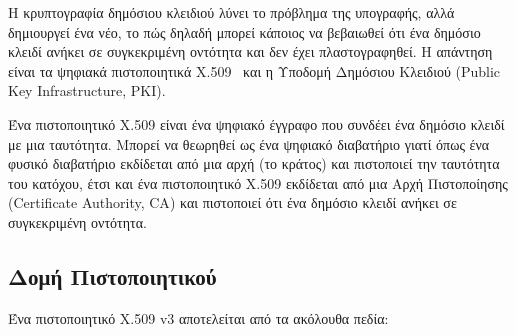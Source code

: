 Η κρυπτογραφία δημόσιου κλειδιού λύνει το πρόβλημα της υπογραφής, αλλά
δημιουργεί ένα νέο, το πώς δηλαδή μπορεί κάποιος να βεβαιωθεί ότι ένα δημόσιο κλειδί
ανήκει σε συγκεκριμένη οντότητα και δεν έχει πλαστογραφηθεί. Η απάντηση
είναι τα ψηφιακά πιστοποιητικά \textlatin{X.509}~\cite{x509rfc} και η
Υποδομή Δημόσιου Κλειδιού (\textlatin{Public Key Infrastructure, PKI}).

Ένα πιστοποιητικό \textlatin{X.509} είναι ένα ψηφιακό έγγραφο που συνδέει
ένα δημόσιο κλειδί με μια ταυτότητα. Μπορεί να θεωρηθεί ως ένα ψηφιακό
διαβατήριο γιατί όπως ένα φυσικό διαβατήριο εκδίδεται από μια αρχή (το κράτος)
και πιστοποιεί την ταυτότητα του κατόχου, έτσι και ένα πιστοποιητικό
\textlatin{X.509} εκδίδεται από μια Αρχή Πιστοποίησης (\textlatin{Certificate
Authority, CA}) και πιστοποιεί ότι ένα δημόσιο κλειδί ανήκει σε συγκεκριμένη
οντότητα.

\subsection{Δομή Πιστοποιητικού}
\label{subsec:x509-structure}

Ένα πιστοποιητικό \textlatin{X.509 v3} αποτελείται από τα ακόλουθα πεδία:

